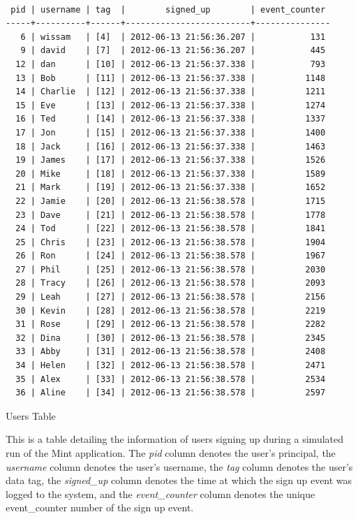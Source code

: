 \begin{table}
\begin{verbatim}

 pid | username | tag  |        signed_up        | event_counter 
-----+----------+------+-------------------------+---------------
   6 | wissam   | [4]  | 2012-06-13 21:56:36.207 |           131
   9 | david    | [7]  | 2012-06-13 21:56:36.207 |           445
  12 | dan      | [10] | 2012-06-13 21:56:37.338 |           793
  13 | Bob      | [11] | 2012-06-13 21:56:37.338 |          1148
  14 | Charlie  | [12] | 2012-06-13 21:56:37.338 |          1211
  15 | Eve      | [13] | 2012-06-13 21:56:37.338 |          1274
  16 | Ted      | [14] | 2012-06-13 21:56:37.338 |          1337
  17 | Jon      | [15] | 2012-06-13 21:56:37.338 |          1400
  18 | Jack     | [16] | 2012-06-13 21:56:37.338 |          1463
  19 | James    | [17] | 2012-06-13 21:56:37.338 |          1526
  20 | Mike     | [18] | 2012-06-13 21:56:37.338 |          1589
  21 | Mark     | [19] | 2012-06-13 21:56:37.338 |          1652
  22 | Jamie    | [20] | 2012-06-13 21:56:38.578 |          1715
  23 | Dave     | [21] | 2012-06-13 21:56:38.578 |          1778
  24 | Tod      | [22] | 2012-06-13 21:56:38.578 |          1841
  25 | Chris    | [23] | 2012-06-13 21:56:38.578 |          1904
  26 | Ron      | [24] | 2012-06-13 21:56:38.578 |          1967
  27 | Phil     | [25] | 2012-06-13 21:56:38.578 |          2030
  28 | Tracy    | [26] | 2012-06-13 21:56:38.578 |          2093
  29 | Leah     | [27] | 2012-06-13 21:56:38.578 |          2156
  30 | Kevin    | [28] | 2012-06-13 21:56:38.578 |          2219
  31 | Rose     | [29] | 2012-06-13 21:56:38.578 |          2282
  32 | Dina     | [30] | 2012-06-13 21:56:38.578 |          2345
  33 | Abby     | [31] | 2012-06-13 21:56:38.578 |          2408
  34 | Helen    | [32] | 2012-06-13 21:56:38.578 |          2471
  35 | Alex     | [33] | 2012-06-13 21:56:38.578 |          2534
  36 | Aline    | [34] | 2012-06-13 21:56:38.578 |          2597

\end{verbatim}
\caption*{Users Table}
\caption{This is a table detailing the information of users signing up during a simulated run of the Mint application. The \emph{pid} column denotes the user's principal, the \emph{username} column denotes the user's username, the \emph{tag} column denotes the user's data tag, the \emph{signed\_up} column denotes the time at which the sign up event was logged to the system, and the \emph{event\_counter} column denotes the unique event\_counter number of the sign up event. }
\label{table:users-info}
\end{table}

